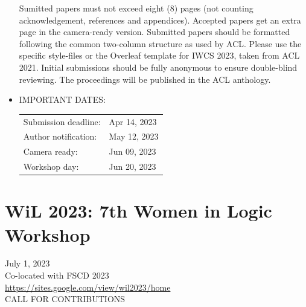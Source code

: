 \documentclass[prodmode,acmtecs]{acmsmall} %
\begin{document}
\begin{itemize}
  Sumitted papers must not exceed eight (8) pages (not counting acknowledgement, references and appendices). Accepted papers get an extra page in the camera-ready version. Submitted papers should be formatted following the common two-column structure as used by ACL. Please use the specific style-files or the Overleaf template for IWCS 2023, taken from ACL 2021. Initial submissions should be fully anonymous to ensure double-blind reviewing. The proceedings will be published in the ACL anthology. 
 
\item  IMPORTANT DATES:  
 
\begin{tabulary}{\linewidth}{LL}Submission deadline:  & Apr 14, 2023 \\
Author notification:  & May 12, 2023 \\
Camera ready:  & Jun 09, 2023 \\
Workshop day:  & Jun 20, 2023 \\
\end{tabulary}
 
\end{itemize}\section{WiL 2023: 7th Women in Logic Workshop}\label{WiL2023}  July 1, 2023\\ 
  Co-located with FSCD 2023\\ 
  \href{https://sites.google.com/view/wil2023/home}{https://sites.google.com/view/wil2023/home}\\ 
CALL FOR CONTRIBUTIONS 
\end{document}
